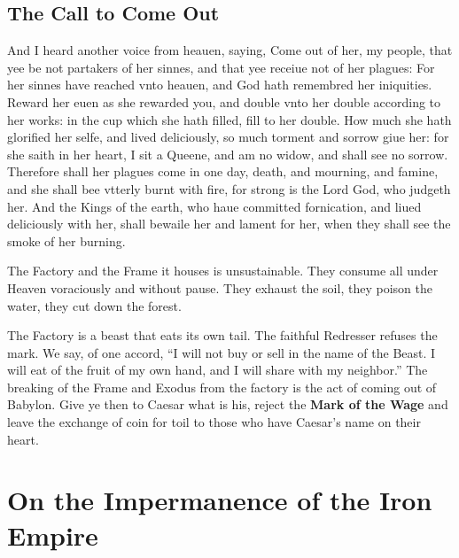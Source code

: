 \subsection{The Call to Come Out}
\begin{scripture}[Rev. 18:4--9]
    And I heard another voice from heauen, saying, Come out of her, my people, that yee be not partakers of her sinnes, and that yee receiue not of her plagues:
    For her sinnes have reached vnto heauen, and God hath remembred her iniquities.
     	Reward her euen as she rewarded you, and double vnto her double according to her works: in the cup which she hath filled, fill to her double.
     	How much she hath glorified her selfe, and lived deliciously, so much torment and sorrow giue her: for she saith in her heart, I sit a Queene, and am no widow, and shall see no sorrow.
     	Therefore shall her plagues come in one day, death, and mourning, and famine, and she shall bee vtterly burnt with fire, for strong is the Lord God, who judgeth her.
     	And the Kings of the earth, who haue committed fornication, and liued deliciously with her, shall bewaile her and lament for her, when they shall see the smoke of her burning.
\end{scripture}
The Factory and the Frame it houses is unsustainable.
They consume all under Heaven voraciously and without pause.
They exhaust the soil, they poison the water, they cut down the forest.

The Factory is a beast that eats its own tail.
The faithful Redresser refuses the mark.
We say, of one accord,
“I will not buy or sell in the name of the Beast.
I will eat of the fruit of my own hand, and I will share with my neighbor.”
The breaking of the Frame and Exodus from the factory is the act of coming out of Babylon.
Give ye then to Caesar what is his, reject the \textbf{Mark of the Wage} and leave the exchange of coin for toil to those who have Caesar's name on their heart.

\section{On the Impermanence of the Iron Empire}
